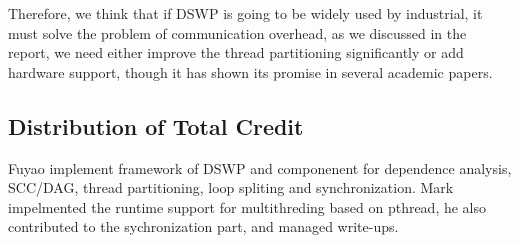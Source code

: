 \documentclass[11pt, letter]{article}
\begin{document}
Therefore, we think that if DSWP is going to be widely used by industrial, it must solve the problem of communication overhead, as we discussed in the report, we need either improve the thread partitioning significantly or add hardware support,  though it has shown its promise in several academic papers. 




\subsection*{Distribution of Total Credit}
Fuyao implement framework of DSWP and componenent for dependence analysis, SCC/DAG, thread partitioning, loop spliting and synchronization. Mark impelmented the runtime support for multithreding based on pthread, he also contributed to the sychronization part, and managed write-ups.
\end{document}
